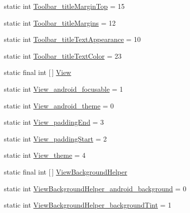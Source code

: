 \begin{DoxyCompactItemize}
\item 
static int \hyperlink{classandroid_1_1support_1_1v7_1_1mediarouter_1_1R_1_1styleable_aac05bd7aeaa312a603d361f90aa05b12}{Toolbar\+\_\+title\+Margin\+Top} = 15
\item 
static int \hyperlink{classandroid_1_1support_1_1v7_1_1mediarouter_1_1R_1_1styleable_ad349f87bff8904fab761a52216460a76}{Toolbar\+\_\+title\+Margins} = 12
\item 
static int \hyperlink{classandroid_1_1support_1_1v7_1_1mediarouter_1_1R_1_1styleable_affda7df8edd05728ddd53881bbf3018d}{Toolbar\+\_\+title\+Text\+Appearance} = 10
\item 
static int \hyperlink{classandroid_1_1support_1_1v7_1_1mediarouter_1_1R_1_1styleable_a2f89f82b7fae914bc2da54aa27c430c8}{Toolbar\+\_\+title\+Text\+Color} = 23
\item 
static final int \mbox{[}$\,$\mbox{]} \hyperlink{classandroid_1_1support_1_1v7_1_1mediarouter_1_1R_1_1styleable_a69727b595e0fa598a4ad38166ab404a9}{View}
\item 
static int \hyperlink{classandroid_1_1support_1_1v7_1_1mediarouter_1_1R_1_1styleable_a865946f96b6ca68bf9a056975bd533f9}{View\+\_\+android\+\_\+focusable} = 1
\item 
static int \hyperlink{classandroid_1_1support_1_1v7_1_1mediarouter_1_1R_1_1styleable_a9d71fcd300bcf0a9a2e237edd5d3a4b8}{View\+\_\+android\+\_\+theme} = 0
\item 
static int \hyperlink{classandroid_1_1support_1_1v7_1_1mediarouter_1_1R_1_1styleable_a9f8c2722c7aba33ebb2dbe4eed4fa4b4}{View\+\_\+padding\+End} = 3
\item 
static int \hyperlink{classandroid_1_1support_1_1v7_1_1mediarouter_1_1R_1_1styleable_a22686a2c312cc840de8e771ac598731f}{View\+\_\+padding\+Start} = 2
\item 
static int \hyperlink{classandroid_1_1support_1_1v7_1_1mediarouter_1_1R_1_1styleable_ae0961a211c233453ac6649347600b383}{View\+\_\+theme} = 4
\item 
static final int \mbox{[}$\,$\mbox{]} \hyperlink{classandroid_1_1support_1_1v7_1_1mediarouter_1_1R_1_1styleable_a65c1a920f4419d63dca1770bf1dd35ca}{View\+Background\+Helper}
\item 
static int \hyperlink{classandroid_1_1support_1_1v7_1_1mediarouter_1_1R_1_1styleable_ac2f353ef7ddd44600660b357e4075019}{View\+Background\+Helper\+\_\+android\+\_\+background} = 0
\item 
static int \hyperlink{classandroid_1_1support_1_1v7_1_1mediarouter_1_1R_1_1styleable_a257b269be5ac880e08242d049999f16c}{View\+Background\+Helper\+\_\+background\+Tint} = 1

\end{DoxyCompactItemize}
